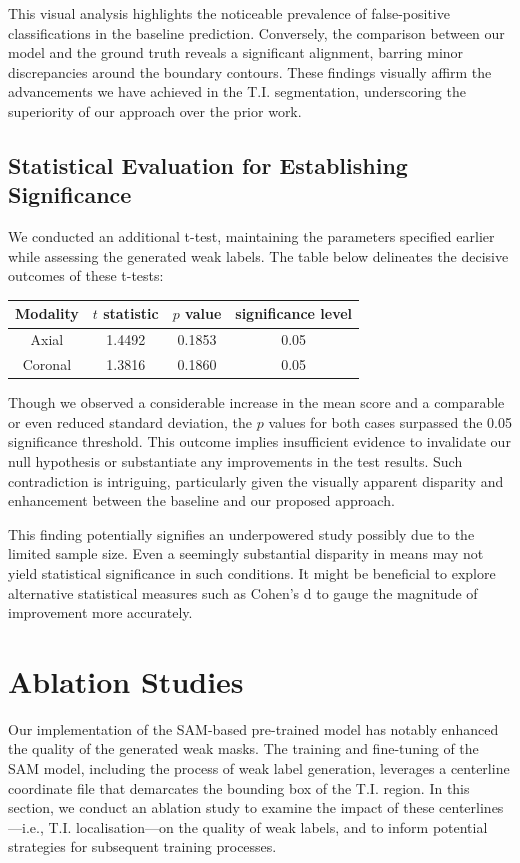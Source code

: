 This visual analysis highlights the noticeable prevalence of false-positive classifications in the baseline prediction. Conversely, the comparison between our model and the ground truth reveals a significant alignment, barring minor discrepancies around the boundary contours. These findings visually affirm the advancements we have achieved in the T.I. segmentation, underscoring the superiority of our approach over the prior work.

\subsection{Statistical Evaluation for Establishing Significance}
We conducted an additional t-test, maintaining the parameters specified earlier while assessing the generated weak labels. The table below delineates the decisive outcomes of these t-tests:

\begin{table}[ht]
\centering
\begin{tabular}{c|c|c|c}
Modality & \(t\) statistic & \(p\) value & significance level \\
\hline
Axial & 1.4492 & 0.1853 & 0.05 \\
\hline
Coronal & 1.3816 & 0.1860 & 0.05
\end{tabular}
\end{table}

Though we observed a considerable increase in the mean score and a comparable or even reduced standard deviation, the \(p\) values for both cases surpassed the 0.05 significance threshold. This outcome implies insufficient evidence to invalidate our null hypothesis or substantiate any improvements in the test results. Such contradiction is intriguing, particularly given the visually apparent disparity and enhancement between the baseline and our proposed approach.

This finding potentially signifies an underpowered study possibly due to the limited sample size. Even a seemingly substantial disparity in means may not yield statistical significance in such conditions. It might be beneficial to explore alternative statistical measures such as Cohen's d to gauge the magnitude of improvement more accurately.

\section{Ablation Studies}

Our implementation of the SAM-based pre-trained model has notably enhanced the quality of the generated weak masks. The training and fine-tuning of the SAM model, including the process of weak label generation, leverages a centerline coordinate file that demarcates the bounding box of the T.I. region. In this section, we conduct an ablation study to examine the impact of these centerlines—i.e., T.I. localisation—on the quality of weak labels, and to inform potential strategies for subsequent training processes.


